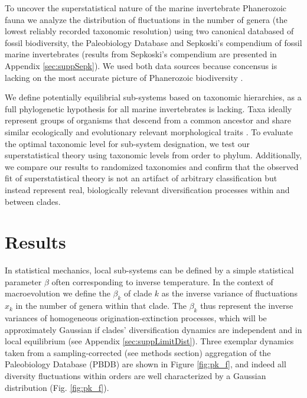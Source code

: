\documentclass[12pt]{article}
\let\citep=\cite
\begin{document}
To uncover the superstatistical nature of the marine invertebrate
Phanerozoic fauna we analyze the distribution of fluctuations in the
number of genera (the lowest reliably recorded taxonomic resolution)
using two canonical databased of fossil biodiversity, the Paleobiology
Database \citep[PBDB;][]{alroy08} and Sepkoski's compendium
\citep{sepkoski1992} of fossil marine invertebrates (results from
Sepkoski's compendium are presented in Appendix
\ref{sec:suppSepk}). We used both data sources because concensus is
lacking on the most accurate picture of Phanerozoic biodiversity
\citep{marshall2010}.

We define potentially equilibrial sub-systems based on taxonomic
hierarchies, as a full phylogenetic hypothesis for all marine
invertebrates is lacking.  Taxa ideally represent groups of organisms
that descend from a common ancestor and share similar ecologically and
evolutionary relevant morphological traits \citep{mayr1965systZool,
  erwin2007}. To evaluate the optimal taxonomic level for sub-system
designation, we test our superstatistical theory using taxonomic
levels from order to phylum. Additionally, we compare our results to
randomized taxonomies and confirm that the observed fit of
superstatistical theory is not an artifact of arbitrary classification
but instead represent real, biologically relevant diversification
processes within and between clades.

\section*{Results}

In statistical mechanics, local sub-systems can be defined by a simple
statistical parameter $\beta$ often corresponding to inverse
temperature. In the context of macroevolution we define the $\beta_k$
of clade $k$ as the inverse variance of fluctuations $x_k$ in the
number of genera within that clade.  The $\beta_k$ thus represent the
inverse variances of homogeneous origination-extinction processes,
which will be approximately Gaussian if clades' diversification
dynamics are independent and in local equilibrium (see Appendix
\ref{sec:suppLimitDist}).  Three exemplar dynamics taken from a
sampling-corrected (see methods section) aggregation of the Paleobiology
Database (PBDB) \citep{alroy08} are shown in Figure \ref{fig:pk_f},
and indeed all diversity fluctuations within orders are well
characterized by a Gaussian distribution (Fig. \ref{fig:pk_f}).
\end{document}
